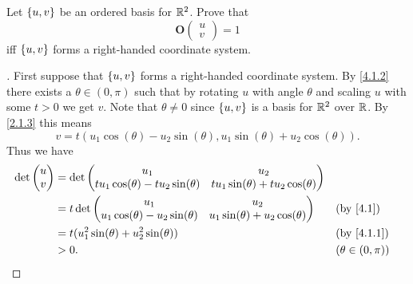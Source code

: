 \begin{ex}\label{ex:4.1.12}
	Let \(\left\lbrace u, v\right\rbrace\) be an ordered basis for \(\mathbb{R}^2\).
	Prove that
	\[
		\mathbf{O}\begin{pmatrix}
			u \\
			v
		\end{pmatrix} = 1
	\]
	iff \(\left\lbrace u, v\right\rbrace\) forms a right-handed coordinate system.
\end{ex}

\begin{proof}[]
	First suppose that \(\left\lbrace u, v\right\rbrace\) forms a right-handed coordinate system.
	By \cref{4.1.2} there exists a \(\theta \in (0, \pi)\) such that by rotating \(u\) with angle \(\theta\) and scaling \(u\) with some \(t > 0\) we get \(v\).
	Note that \(\theta \neq 0\) since \(\left\lbrace u, v\right\rbrace\) is a basis for \(\mathbb{R}^2\) over \(\mathbb{R}\).
	By \cref{2.1.3} this means
	\[
		v = t (u_1 \cos(\theta) - u_2 \sin(\theta), u_1 \sin(\theta) + u_2 \cos(\theta)).
	\]
	Thus we have
	\begin{align*}
		\det\begin{pmatrix}
			    u \\
			    v
		    \end{pmatrix} & = \det\begin{pmatrix}
			                          u_1                                     & u_2                                     \\
			                          t u_1 \cos(\theta) - t u_2 \sin(\theta) & t u_1 \sin(\theta) + t u_2 \cos(\theta)
		                          \end{pmatrix}                           \\
		                    & = t \det\begin{pmatrix}
			                              u_1                                 & u_2                                 \\
			                              u_1 \cos(\theta) - u_2 \sin(\theta) & u_1 \sin(\theta) + u_2 \cos(\theta)
		                              \end{pmatrix}         &  & \by{4.1}                               \\
		                    & = t (u_1^2 \sin(\theta) + u_2^2 \sin(\theta))                                        &  & \by{4.1.1}            \\
		                    & > 0.                                                                                 &  & (\theta \in (0, \pi))
	\end{align*}

\end{proof}
